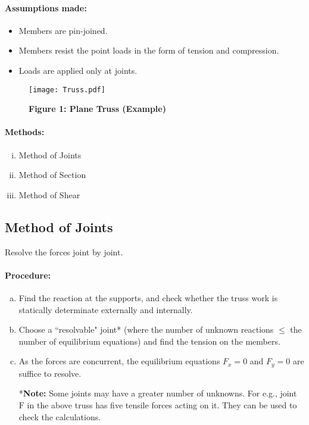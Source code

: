 \documentclass{article}
\begin{document}
{\paragraph{\Large Assumptions made:}
\begin{itemize}
\item Members are pin-joined.
\item Members resist the point loads in the form of tension and compression.
\item Loads are applied only at joints.
\end{itemize}
\begin{figure}
\caption*{\Large \textbf{Figure 1: Plane Truss (Example)}}
\hbox{\hspace{-4.5cm}\texttt{[image: Truss.pdf]}}
\end{figure}
\newpage
\paragraph{\Large Methods:}
\begin{enumerate}[(i)]
\item Method of Joints
\item Method of Section
\item Method of Shear
\end{enumerate}
\subsection{\LARGE Method of Joints}
Resolve the forces joint by joint.
\paragraph{\Large Procedure:}
\begin{enumerate}[(a)]
\item Find the reaction at the supports, and check whether the truss work is statically determinate externally and internally.
\item Choose a ``resolvable" joint* (where the number of unknown reactions $\leq$ the number of equilibrium equations) and find the tension on the members.
\item As the forces are concurrent, the equilibrium equations $F_x=0$ and $F_y=0$ are suffice to resolve.
\newline

*\textbf{Note:} Some joints may have a greater number of unknowns. For e.g., joint $\mathrm F$ in the above truss has five tensile forces acting on it. They can be used to check the calculations.
\end{enumerate}
\newpage
}
\end{document}
